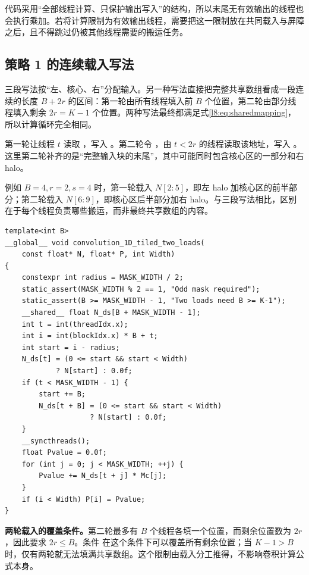 代码采用“全部线程计算、只保护输出写入”的结构，所以末尾无有效输出的线程也会执行乘加。若将计算限制为有效输出线程，需要把这一限制放在共同载入与屏障之后，且不得跳过仍被其他线程需要的搬运任务。

\subsection{策略 1 的连续载入写法}
三段写法按“左、核心、右”分配输入。另一种写法直接把完整共享数组看成一段连续的长度 $B+2r$ 的区间：第一轮由所有线程填入前 $B$ 个位置，第二轮由部分线程填入剩余 $2r=K-1$ 个位置。两种写法最终都满足式\eqref{l8:eq:sharedmapping}，所以计算循环完全相同。

第一轮让线程 $t$ 读取 ，写入 。第二轮令 ，由 $t<2r$ 的线程读取该地址，写入 。这里第二轮补齐的是“完整输入块的末尾”，其中可能同时包含核心区的一部分和右 halo。

例如 $B=4,r=2,s=4$ 时，第一轮载入 $N[2:5]$，即左 halo 加核心区的前半部分；第二轮载入 $N[6:9]$，即核心区后半部分加右 halo。与三段写法相比，区别在于每个线程负责哪些搬运，而非最终共享数组的内容。

\par\noindent\begin{minipage}{\linewidth}
\begin{lstlisting}[caption={策略 1：两轮连续载入；需要 $K-1\le B$。},label={l8:lst:two}]
template<int B>
__global__ void convolution_1D_tiled_two_loads(
    const float* N, float* P, int Width)
{
    constexpr int radius = MASK_WIDTH / 2;
    static_assert(MASK_WIDTH % 2 == 1, "Odd mask required");
    static_assert(B >= MASK_WIDTH - 1, "Two loads need B >= K-1");
    __shared__ float N_ds[B + MASK_WIDTH - 1];
    int t = int(threadIdx.x);
    int i = int(blockIdx.x) * B + t;
    int start = i - radius;
    N_ds[t] = (0 <= start && start < Width)
            ? N[start] : 0.0f;
    if (t < MASK_WIDTH - 1) {
        start += B;
        N_ds[t + B] = (0 <= start && start < Width)
                    ? N[start] : 0.0f;
    }
    __syncthreads();
    float Pvalue = 0.0f;
    for (int j = 0; j < MASK_WIDTH; ++j) {
        Pvalue += N_ds[t + j] * Mc[j];
    }
    if (i < Width) P[i] = Pvalue;
}
\end{lstlisting}
\end{minipage}\par

\textbf{两轮载入的覆盖条件。}第二轮最多有 $B$ 个线程各填一个位置，而剩余位置数为 $2r$，因此要求 $2r\le B$。条件  在这个条件下可以覆盖所有剩余位置；当 $K-1>B$ 时，仅有两轮就无法填满共享数组。这个限制由载入分工推得，不影响卷积计算公式本身。


